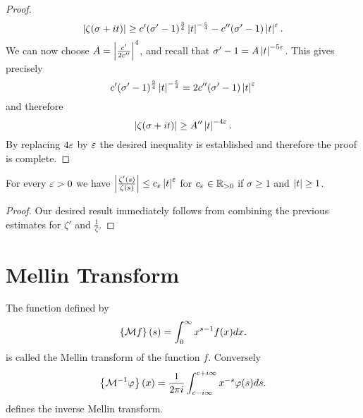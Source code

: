 \begin{proof}
\begin{equation*}
	\left|\zeta(\sigma + it)\right| \geq c'(\sigma' - 1)^{\frac{3}{4}}\left|t\right|^{-\frac{\varepsilon}{4}} - c''(\sigma' - 1)\left|t\right|^{\varepsilon}.
\end{equation*}
	We can now choose $A = \left|\frac{c'}{2 c''}\right|^4$, and recall that $\sigma' - 1 = A \left|t\right|^{-5 \varepsilon}$. This gives precisely
\begin{equation*}
	c'(\sigma' - 1)^{\frac{3}{4}} \left|t\right|^{-\frac{\varepsilon}{4}} = 2 c''(\sigma' - 1) \left|t\right|^{\varepsilon}
\end{equation*}
	and therefore
\begin{equation*}
	\left|\zeta(\sigma + it)\right| \geq A''\left|t\right|^{-4 \varepsilon}.
\end{equation*}
	By replacing $4 \varepsilon$ by $\varepsilon$ the desired inequality is established and therefore the proof is complete.
\end{proof}


\begin{corollary}\label{cor:ZetaQuotEst}
	For every $\varepsilon > 0$ we have $\left|\frac{\zeta'(s)}{\zeta(s)}\right| \leq c_\varepsilon \left|t\right|^\varepsilon$ for $c_\varepsilon \in \mathbb{R}_{> 0}$ if $\sigma \geq 1$ and $\left|t\right| \geq 1$.
\end{corollary}
\begin{proof}
	Our desired result immediately follows from combining the previous estimates for $\zeta'$ and $\frac{1}{\zeta}$.
\end{proof}


\section{Mellin Transform}


\begin{definition}
	The function defined by
\begin{equation*}
	\left\{\mathcal{M}f\right\}(s) = \int _0 ^\infty x^{s - 1} f(x) dx.
\end{equation*}
	is called the Mellin transform of the function $f$. Conversely
\begin{equation*}
	\left\{\mathcal{M}^{-1} \varphi\right\}(x) = \frac{1}{2 \pi i} \int _{c - i \infty} ^{c + i \infty} x^{-s} \varphi(s) ds.
\end{equation*}
	defines the inverse Mellin transform.
\end{definition}


